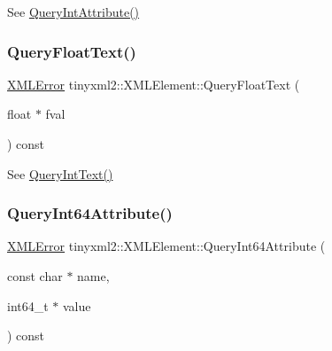 See \hyperlink{classtinyxml2_1_1_x_m_l_element_a8a78bc1187c1c45ad89f2690eab567b1}{Query\+Int\+Attribute()} 

\mbox{\label{classtinyxml2_1_1_x_m_l_element_afa332afedd93210daa6d44b88eb11e29}} 
\subsubsection{\texorpdfstring{Query\+Float\+Text()}{QueryFloatText()}}
{\footnotesize\ttfamily \hyperlink{namespacetinyxml2_a1fbf88509c3ac88c09117b1947414e08}{X\+M\+L\+Error} tinyxml2\+::\+X\+M\+L\+Element\+::\+Query\+Float\+Text (\begin{DoxyParamCaption}\item[{float $\ast$}]{fval }\end{DoxyParamCaption}) const}



See \hyperlink{classtinyxml2_1_1_x_m_l_element_a926357996bef633cb736e1a558419632}{Query\+Int\+Text()} 

\mbox{\label{classtinyxml2_1_1_x_m_l_element_a7c0955d80b6f8d196744eacb0f6e90a8}} 
\subsubsection{\texorpdfstring{Query\+Int64\+Attribute()}{QueryInt64Attribute()}}
{\footnotesize\ttfamily \hyperlink{namespacetinyxml2_a1fbf88509c3ac88c09117b1947414e08}{X\+M\+L\+Error} tinyxml2\+::\+X\+M\+L\+Element\+::\+Query\+Int64\+Attribute (\begin{DoxyParamCaption}\item[{const char $\ast$}]{name,  }\item[{int64\+\_\+t $\ast$}]{value }\end{DoxyParamCaption}) const\hspace{0.3cm}{\ttfamily [inline]}}



